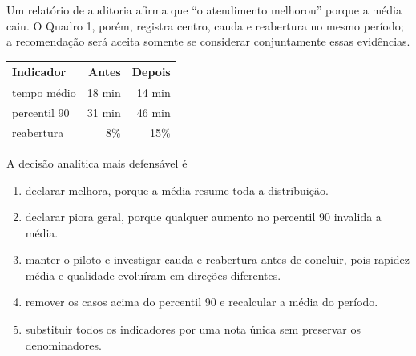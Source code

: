 \TextoBase Um relatório de auditoria afirma que ``o atendimento melhorou'' porque a média caiu. O Quadro 1, porém, registra centro, cauda e reabertura no mesmo período; a recomendação será aceita somente se considerar conjuntamente essas evidências.
\begin{DocumentBox}
\begin{tabularx}{\textwidth}{@{}Yrr@{}}\toprule
\textbf{Indicador} & \textbf{Antes} & \textbf{Depois}\\\midrule
tempo médio & 18 min & 14 min\\ percentil 90 & 31 min & 46 min\\ reabertura & 8\% & 15\%\\\bottomrule
\end{tabularx}
\end{DocumentBox}
\FonteDidatica
\Comando A decisão analítica mais defensável é
\begin{enumerate}[label=\Alph*)]
\item declarar melhora, porque a média resume toda a distribuição.
\item declarar piora geral, porque qualquer aumento no percentil 90 invalida a média.
\item manter o piloto e investigar cauda e reabertura antes de concluir, pois rapidez média e qualidade evoluíram em direções diferentes.
\item remover os casos acima do percentil 90 e recalcular a média do período.
\item substituir todos os indicadores por uma nota única sem preservar os denominadores.
\end{enumerate}

